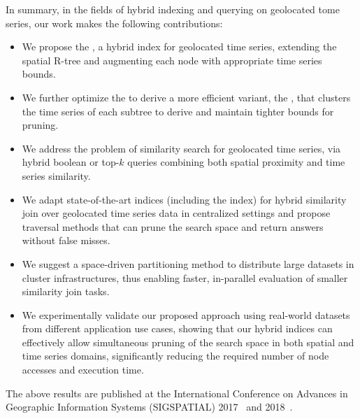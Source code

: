 In summary, in the fields of hybrid indexing and querying on geolocated tome series, our work makes the following contributions:

\begin{itemize}
 \item We propose the \tsr, a hybrid index for geolocated time series, extending the spatial R-tree and augmenting each node with appropriate time series bounds.
 \item We further optimize the \tsr to derive a more efficient variant, the \btsr, that clusters the time series of each subtree to derive and maintain tighter bounds for pruning.
 \item We address the problem of similarity search for geolocated time series, via hybrid boolean or top-$k$ queries combining both spatial proximity and time series similarity.
 \item We adapt state-of-the-art indices (including the \btsr index) for hybrid similarity join over geolocated time series data in centralized settings and propose traversal methods that can prune the search space and return answers without false misses.
 \item We suggest a space-driven partitioning method to distribute large datasets in cluster infrastructures, thus enabling faster, in-parallel evaluation of smaller similarity join tasks.
 \item We experimentally validate our proposed approach using real-world datasets from different application use cases, showing that our hybrid indices can effectively allow simultaneous pruning of the search space in both spatial and time series domains, significantly reducing the required number of node accesses and execution time.
\end{itemize}

The above results are published at the International Conference on Advances in Geographic Information Systems (SIGSPATIAL) 2017~\cite{chatzig17btsr} and 2018~\cite{chatzigeorgakidis2018scalable}.

